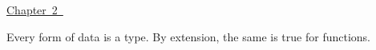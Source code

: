 \mbox{\hyperlink{2}{Chapter 2 }}

Every form of data is a type. By extension, the same is true for functions. 